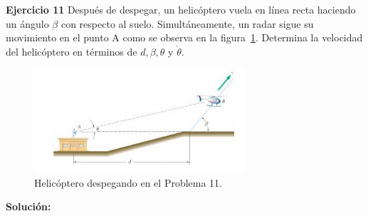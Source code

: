 \documentclass[a4paper,11pt]{scrartcl}
\begin{document}
\textbf{Ejercicio 11} Después de despegar, un helicóptero vuela en línea recta haciendo un ángulo $\beta$ con respecto al suelo. Simultáneamente, un radar sigue su movimiento en el punto A como se observa en la figura~\ref{fig:11_1}. Determina la velocidad del helicóptero en términos de $d, \beta, \theta$ y $\dot{\theta}$.\\

\begin{figure}[h!]
  \centering
  \includegraphics[width=0.7\textwidth]{11_1}
  \caption{Helicóptero despegando en el Problema 11.}
  \label{fig:11_1}
\end{figure}

\textbf{Solución:}
\end{document}

